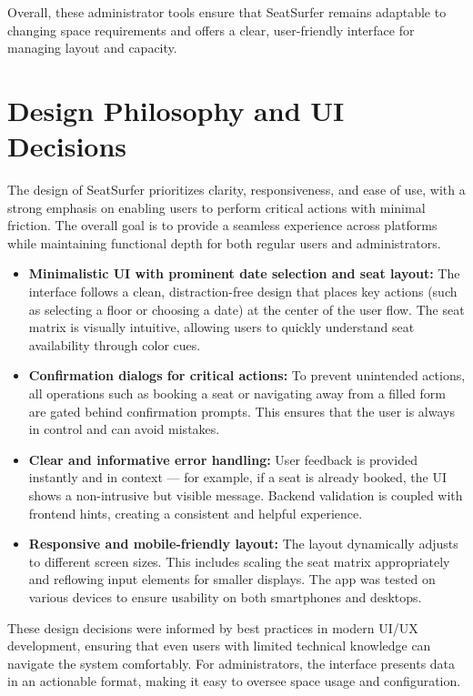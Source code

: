 \documentclass[12pt,a4paper]{report}
\begin{document}
Overall, these administrator tools ensure that SeatSurfer remains adaptable to changing space requirements and offers a clear, user-friendly interface for managing layout and capacity.

\section{Design Philosophy and UI Decisions}

The design of SeatSurfer prioritizes clarity, responsiveness, and ease of use, with a strong emphasis on enabling users to perform critical actions with minimal friction. The overall goal is to provide a seamless experience across platforms while maintaining functional depth for both regular users and administrators.

\begin{itemize}
    \item \textbf{Minimalistic UI with prominent date selection and seat layout:}  
    The interface follows a clean, distraction-free design that places key actions (such as selecting a floor or choosing a date) at the center of the user flow. The seat matrix is visually intuitive, allowing users to quickly understand seat availability through color cues.

    \item \textbf{Confirmation dialogs for critical actions:}  
    To prevent unintended actions, all operations such as booking a seat or navigating away from a filled form are gated behind confirmation prompts. This ensures that the user is always in control and can avoid mistakes.

    \item \textbf{Clear and informative error handling:}  
    User feedback is provided instantly and in context — for example, if a seat is already booked, the UI shows a non-intrusive but visible message. Backend validation is coupled with frontend hints, creating a consistent and helpful experience.

    \item \textbf{Responsive and mobile-friendly layout:}  
    The layout dynamically adjusts to different screen sizes. This includes scaling the seat matrix appropriately and reflowing input elements for smaller displays. The app was tested on various devices to ensure usability on both smartphones and desktops.
\end{itemize}

These design decisions were informed by best practices in modern UI/UX development, ensuring that even users with limited technical knowledge can navigate the system comfortably. For administrators, the interface presents data in an actionable format, making it easy to oversee space usage and configuration.
\end{document}

